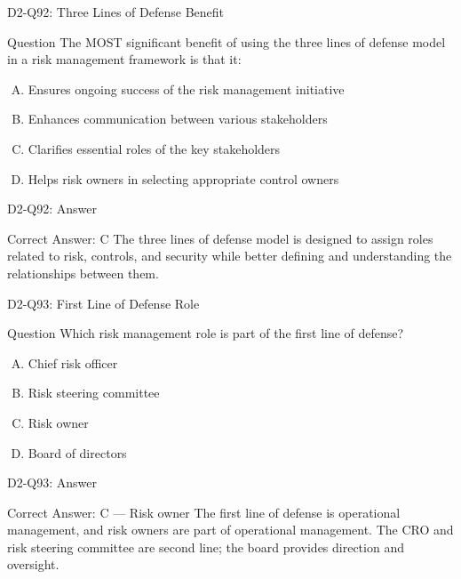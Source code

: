 \documentclass{beamer}
\begin{document}
	\begin{frame}{D2-Q92: Three Lines of Defense Benefit}
		\begin{block}{Question}
			The MOST significant benefit of using the three lines of defense model in a risk management framework is that it:
		\end{block}
		\begin{enumerate}[(A)]
			\item Ensures ongoing success of the risk management initiative
			\item Enhances communication between various stakeholders
			\item Clarifies essential roles of the key stakeholders
			\item Helps risk owners in selecting appropriate control owners
		\end{enumerate}
	\end{frame}
	\begin{frame}{D2-Q92: Answer}
		\begin{block}{Correct Answer: C}
			The three lines of defense model is designed to assign roles related to risk, controls, and security while better defining and understanding the relationships between them.
		\end{block}
	\end{frame}
	
	\begin{frame}{D2-Q93: First Line of Defense Role}
		\begin{block}{Question}
			Which risk management role is part of the first line of defense?
		\end{block}
		\begin{enumerate}[(A)]
			\item Chief risk officer
			\item Risk steering committee
			\item Risk owner
			\item Board of directors
		\end{enumerate}
	\end{frame}
	\begin{frame}{D2-Q93: Answer}
		\begin{block}{Correct Answer: C --- Risk owner}
			The first line of defense is operational management, and risk owners are part of operational management. The CRO and risk steering committee are second line; the board provides direction and oversight.
		\end{block}
	\end{frame}
	
\end{document}
